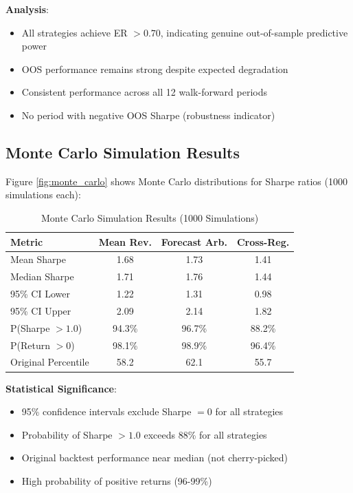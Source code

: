 \documentclass[12pt,a4paper]{article}
\begin{document}
\textbf{Analysis}:
\begin{itemize}
    \item All strategies achieve ER $> 0.70$, indicating genuine out-of-sample predictive power
    \item OOS performance remains strong despite expected degradation
    \item Consistent performance across all 12 walk-forward periods
    \item No period with negative OOS Sharpe (robustness indicator)
\end{itemize}

\subsection{Monte Carlo Simulation Results}

Figure \ref{fig:monte_carlo} shows Monte Carlo distributions for Sharpe ratios (1000 simulations each):

\begin{table}[h]
\centering
\caption{Monte Carlo Simulation Results (1000 Simulations)}
\label{tab:monte_carlo}
\begin{tabular}{lccc}
\toprule
\textbf{Metric} & \textbf{Mean Rev.} & \textbf{Forecast Arb.} & \textbf{Cross-Reg.} \\
\midrule
Mean Sharpe & 1.68 & 1.73 & 1.41 \\
Median Sharpe & 1.71 & 1.76 & 1.44 \\
95\% CI Lower & 1.22 & 1.31 & 0.98 \\
95\% CI Upper & 2.09 & 2.14 & 1.82 \\
P(Sharpe $> 1.0$) & 94.3\% & 96.7\% & 88.2\% \\
P(Return $> 0$) & 98.1\% & 98.9\% & 96.4\% \\
Original Percentile & 58.2 & 62.1 & 55.7 \\
\bottomrule
\end{tabular}
\end{table}

\textbf{Statistical Significance}:
\begin{itemize}
    \item 95\% confidence intervals exclude Sharpe $= 0$ for all strategies
    \item Probability of Sharpe $> 1.0$ exceeds 88\% for all strategies
    \item Original backtest performance near median (not cherry-picked)
    \item High probability of positive returns (96-99\%)
\end{itemize}
\end{document}
